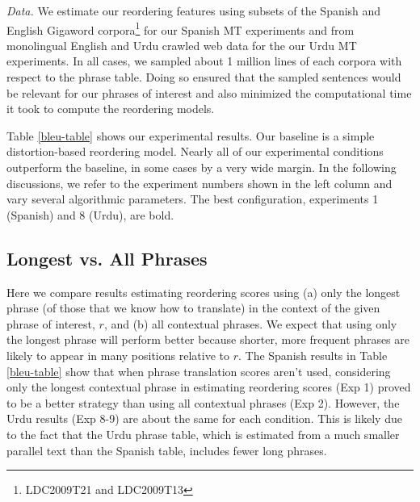 \documentclass[11pt,letterpaper]{article}
\newcommand{\todo}[1]{\textcolor{red}{TODO: #1}}
\newcommand{\paraheader}[1]{\vskip 0.05in \noindent\emph{#1}}
\begin{document}
\begin{table}[t]
\begin{smaller}
\vskip -0.15in
\end{smaller}
\end{table}


\paraheader{Data.} We estimate our reordering features using subsets of the Spanish and English Gigaword corpora\footnote{LDC2009T21 and LDC2009T13} for our Spanish MT experiments and from monolingual English and Urdu crawled web data for the our Urdu MT experiments. In all cases, we sampled about 1 million lines of each corpora with respect to the phrase table. Doing so ensured that the sampled sentences would be relevant for our phrases of interest and also minimized the computational time it took to compute the reordering models.


Table \ref{bleu-table} shows our experimental results. Our baseline is a simple distortion-based reordering model. Nearly all of our experimental conditions outperform the baseline, in some cases by a very wide margin. In the following discussions, we refer to the experiment numbers shown in the left column and vary several algorithmic parameters. The best configuration, experiments 1 (Spanish) and 8 (Urdu), are bold. %

\subsection{Longest vs. All Phrases}
Here we compare results estimating reordering scores using (a) only the longest phrase (of those that we know how to translate) in the context of the given phrase of interest, $r$, and (b) all contextual phrases. We expect that using only the longest phrase will perform better because shorter, more frequent phrases are likely to appear in many positions relative to $r$. The Spanish results in Table \ref{bleu-table} show that when phrase translation scores aren't used, considering only the longest contextual phrase in estimating reordering scores (Exp 1) proved to be a better strategy than using all contextual phrases (Exp 2). However, the Urdu results (Exp 8-9) are about the same for each condition. This is likely due to the fact that the Urdu phrase table, which is estimated from a much smaller parallel text than the Spanish table, includes fewer long phrases.
\end{document}
